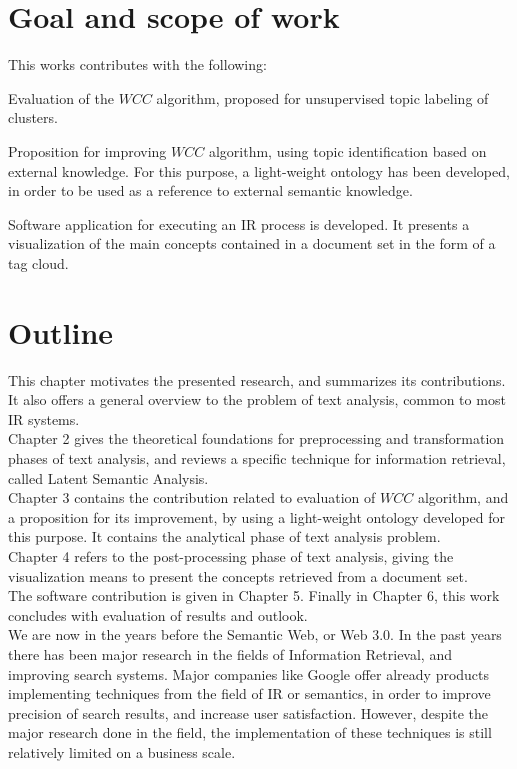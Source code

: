 \begin{center}
\section{Goal and scope of work}
This works contributes with the following:
\begin{list}{}{}
\item Evaluation of the $ WCC $ algorithm, proposed for unsupervised topic labeling of clusters\cite{Stein04topicidentification}.
\item Proposition for improving $ WCC $ algorithm, using topic identification based on external knowledge. For this purpose, a light-weight ontology has been developed, in order to be used as a reference to external semantic knowledge. 
\item Software application for executing an IR process is developed. It presents a visualization of the main concepts contained in a document set in the form of a tag cloud.
\end{list}

\section{Outline}
This chapter motivates the presented research, and summarizes its contributions. It also offers a general overview to the problem of text analysis, common to most IR systems. \\
Chapter 2 gives the theoretical foundations for preprocessing and transformation phases of text analysis, and reviews a specific technique for information retrieval, called Latent Semantic Analysis. \\
Chapter 3 contains the contribution related to evaluation of $WCC$ algorithm, and a proposition for its improvement, by using a light-weight ontology developed for this purpose. It contains the analytical phase of text analysis problem. \\
Chapter 4 refers to the post-processing phase of text analysis, giving the visualization means to present the concepts retrieved from a document set. \\
The software contribution is given in Chapter 5. Finally in Chapter 6, this work concludes with evaluation of results and outlook.\\


We are now in the years before the Semantic Web, or Web 3.0. In the past years there has been major research in the fields of Information Retrieval, and improving search systems. Major companies like Google offer already products implementing techniques from the field of IR or semantics, in order to improve precision of search results, and increase user satisfaction.
However, despite the major research done in the field, the implementation of these techniques is still relatively limited on a business scale.\\


\end{center}
